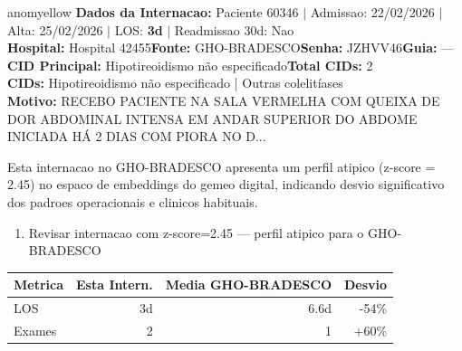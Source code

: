 \documentclass[a4paper,10pt]{article}
\begin{document}
\begin{anomalycard}[Internacao 118038 | GHO-BRADESCO | MODERADO (z=2.45)]{anomyellow}
\textbf{Dados da Internacao:} Paciente 60346 $\mid$ Admissao: 22/02/2026 $\mid$ Alta: 25/02/2026 $\mid$ LOS: \textbf{3d} $\mid$ Readmissao 30d: Nao\\
\textbf{Hospital:} Hospital 42455\quad\textbf{Fonte:} GHO-BRADESCO\quad\textbf{Senha:} JZHVV46\quad\textbf{Guia:} ---\\
\textbf{CID Principal:} {\small Hipotireoidismo não especificado}\quad\textbf{Total CIDs:} 2\\

\textbf{CIDs:} {\scriptsize Hipotireoidismo não especificado | Outras colelitíases}\\

\textbf{Motivo:} {\scriptsize RECEBO PACIENTE NA SALA VERMELHA COM QUEIXA DE DOR ABDOMINAL INTENSA EM ANDAR SUPERIOR DO ABDOME INICIADA HÁ 2 DIAS COM PIORA NO D...}\\

\vspace{2pt}\begin{tcolorbox}[colback=severityred!20,colframe=anomyellow,title={\textbf{Interpretacao de Negocio}},fonttitle=\bfseries\small,left=4pt,right=4pt,top=3pt,bottom=3pt]
{\small Esta internacao no GHO-BRADESCO apresenta um perfil atipico (z-score = 2.45) no espaco de embeddings do gemeo digital, indicando desvio significativo dos padroes operacionais e clinicos habituais.}
\end{tcolorbox}
\begin{tcolorbox}[colback=severityyellow!30,colframe=anomorange,title={\textbf{Recomendacoes Especificas}},fonttitle=\bfseries\small,left=4pt,right=4pt,top=3pt,bottom=3pt]
\begin{enumerate}[nosep,leftmargin=16pt]
\item {\small Revisar internacao com z-score=2.45 --- perfil atipico para o GHO-BRADESCO}
\end{enumerate}
\end{tcolorbox}
\begin{center}\begin{tabular}{l r r r}\toprule\textbf{Metrica} & \textbf{Esta Intern.} & \textbf{Media GHO-BRADESCO} & \textbf{Desvio} \\\midrule
LOS & 3d & 6.6d & -54\% \\
Exames & 2 & 1 & \textcolor{anomorange}{+60\%} \\
\bottomrule\end{tabular}\end{center}


\end{anomalycard}
\end{document}
